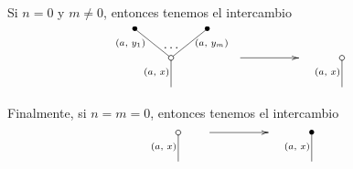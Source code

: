 \documentclass[../main.tex]{subfiles}
\begin{document}
Si $n=0$ y $m\ne 0$, entonces tenemos el intercambio
\begin{equation}
    \xy
    <0.08cm, 0cm>:
    (0.0, 0.0)*{}="1"; %
    (0.0, 10.0)*\cir<2pt>{}="2"; %
    (-12.5, 20.0)*=0{\bullet}="3"; %
    (12.5, 20.0)*=0{\bullet}="4"; %
    "1";"2" **\dir{-};
    "2";"3" **\dir{-};
    "2";"4" **\dir{-};
    (-5.0, 5.0)*=0{\scriptstyle (a,\text{ }x)};
    (-14, 15.0)*=0{\scriptstyle (a,\text{ }y_1)};
    (14, 15.0)*=0{\scriptstyle (a,\text{ }y_m)};
    (0,13.5)*{\dots};
    \endxy
    \xy
    <0.08cm, 0cm>:
    (-20, 0.0)*{}="1";
    (20, 10.0)*{}="2";
    {\ar(-10, 10)*{};(10,10)*{}};
    \endxy
    \xy
    <0.08cm, 0cm>:
    (0.0, 0.0)*{}="1"; %
    (0.0, 10.0)*\cir<2pt>{}="2"; %
    "1";"2" **\dir{-};
    (-5.0, 5.0)*=0{\scriptstyle (a,\text{ }x)};
    \endxy
\end{equation}

Finalmente, si $n=m=0$, entonces tenemos el intercambio
\begin{equation}
    \xy
    <0.08cm, 0cm>:
    (0.0, 0.0)*{}="1"; %
    (0.0, 10.0)*\cir<2pt>{}="2"; %
    "1";"2" **\dir{-};
    (-5.0, 5.0)*=0{\scriptstyle (a,\text{ }x)};
    \endxy
    \xy
    <0.08cm, 0cm>:
    (-20, 0.0)*{}="1";
    (20, 10.0)*{}="2";
    {\ar(-10, 10)*{};(10,10)*{}};
    \endxy
    \xy
    <0.08cm, 0cm>:
    (0.0, 0.0)*{}="1"; %
    (0.0, 10.0)*=0{\bullet}="2"; %
    "1";"2" **\dir{-};
    (-5.0, 5.0)*=0{\scriptstyle (a,\text{ }x)};
    \endxy
\end{equation}
\end{document}
